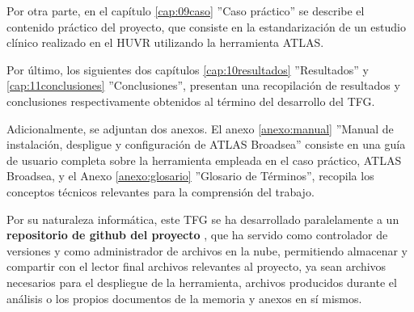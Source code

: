 Por otra parte, en el capítulo \ref{cap:09caso} ''Caso práctico'' se describe el contenido práctico del proyecto, que consiste en la estandarización de un estudio clínico realizado en el HUVR utilizando la herramienta ATLAS. 

Por último, los siguientes dos capítulos \ref{cap:10resultados} ''Resultados'' y \ref{cap:11conclusiones} ''Conclusiones'', presentan una recopilación de resultados y conclusiones respectivamente obtenidos al término del desarrollo del TFG. 

Adicionalmente, se adjuntan dos anexos. El anexo \ref{anexo:manual} ''Manual de instalación, despligue y configuración de ATLAS Broadsea'' consiste en una guía de usuario completa sobre la herramienta empleada en el caso práctico, ATLAS Broadsea, y el Anexo \ref{anexo:glosario} ''Glosario de Términos'', recopila los conceptos técnicos relevantes para la comprensión del trabajo. 

Por su naturaleza informática, este TFG se ha desarrollado paralelamente a un \textbf{repositorio de github del proyecto} \cite{vallealonsodc}, que ha servido como controlador de versiones y como administrador de archivos en la nube, permitiendo almacenar y compartir con el lector final archivos relevantes al proyecto, ya sean archivos necesarios para el despliegue de la herramienta, archivos producidos durante el análisis o los propios documentos de la memoria y anexos en sí mismos.
